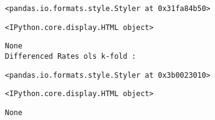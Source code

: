 \documentclass[11pt]{article}
\begin{document}
    
    \begin{Verbatim}[commandchars=\\\{\}]
<pandas.io.formats.style.Styler at 0x31fa84b50>
    \end{Verbatim}

    
    
    \begin{Verbatim}[commandchars=\\\{\}]
<IPython.core.display.HTML object>
    \end{Verbatim}

    
    \begin{Verbatim}[commandchars=\\\{\}]
None
Differenced Rates ols k-fold :
    \end{Verbatim}

    
    \begin{Verbatim}[commandchars=\\\{\}]
<pandas.io.formats.style.Styler at 0x3b0023010>
    \end{Verbatim}

    
    
    \begin{Verbatim}[commandchars=\\\{\}]
<IPython.core.display.HTML object>
    \end{Verbatim}

    
    \begin{Verbatim}[commandchars=\\\{\}]
None
    \end{Verbatim}
\end{document}

